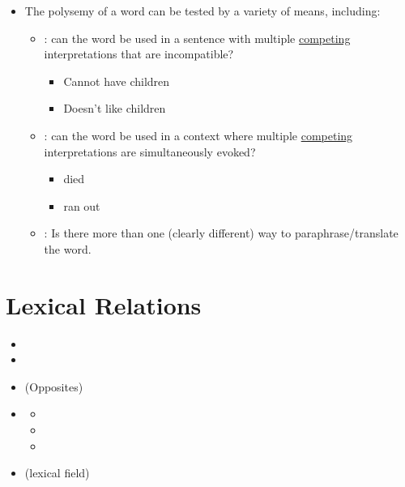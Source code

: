 \documentclass[headrule,footrule]{foils}
\begin{document}
\begin{itemize}
\item The polysemy of a word can be tested by a variety of means, including:
  \begin{itemize}
  \item {}: can the word be used in a sentence with
    multiple \underline{competing} interpretations that are incompatible? \\[1ex]
    \begin{itemize}
    \item Cannot have children
    \item Doesn't like children
    \end{itemize}
  \item {}: can the word be used in a context where multiple
    \underline{competing} interpretations are simultaneously evoked? \\[1ex]
    \begin{itemize}
    \item died
    \item ran out
    \end{itemize}
  \item  {}: Is there more than one (clearly different) way to paraphrase/translate the word.
  \end{itemize}
\end{itemize}

\section{Lexical Relations}


\begin{itemize}
\item {}
\item {}
\item {} (Opposites)
\item {}
    \begin{itemize}
    \item {}
    \item {}
    \item {}
    \end{itemize}
  \item {} (lexical field)
\end{itemize}
\end{document}
